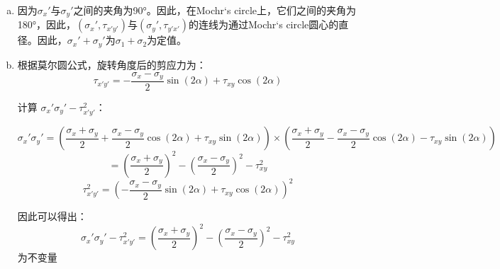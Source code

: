 \begin{enumerate}[(a)]
    \item 
    因为\(\sigma_x'\text{与}\sigma_y'\)之间的夹角为90°。因此，在Mochr`s circle上，它们之间的夹角为180°，因此，\((\sigma_x',\tau_{x'y'})\text{与}(\sigma_y',\tau_{y'x'})\)的连线为通过Mochr`s circle圆心的直径。因此，\(\sigma_x'+\sigma_y'\)为\(\sigma_1+\sigma_2\)为定值。
    \item 
    根据莫尔圆公式，旋转角度后的剪应力为：
    \[\tau_{x'y'} = -\frac{\sigma_x - \sigma_y}{2} \sin(2\alpha) + \tau_{xy} \cos(2\alpha)\]

    计算 \( \sigma_x' \sigma_y' - \tau_{x'y'}^2 \)：

    \[\sigma_x' \sigma_y' = \left( \frac{\sigma_x + \sigma_y}{2} + \frac{\sigma_x - \sigma_y}{2} \cos(2\alpha) + \tau_{xy} \sin(2\alpha) \right) \times \left( \frac{\sigma_x + \sigma_y}{2} - \frac{\sigma_x - \sigma_y}{2} \cos(2\alpha) - \tau_{xy} \sin(2\alpha) \right)\]
    \[= \left( \frac{\sigma_x + \sigma_y}{2} \right)^2 - \left( \frac{\sigma_x - \sigma_y}{2} \right)^2 - \tau_{xy}^2\]
    \[\tau_{x'y'}^2 = \left( - \frac{\sigma_x - \sigma_y}{2} \sin(2\alpha) + \tau_{xy} \cos(2\alpha) \right)^2\]

    因此可以得出：
    \[\sigma_x' \sigma_y' - \tau_{x'y'}^2 = \left( \frac{\sigma_x + \sigma_y}{2} \right)^2 - \left( \frac{\sigma_x - \sigma_y}{2} \right)^2 - \tau_{xy}^2\]
    为不变量
\end{enumerate}
